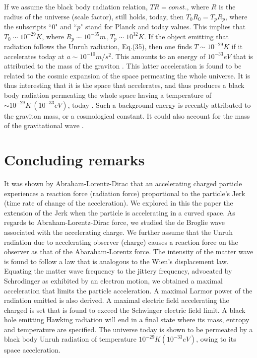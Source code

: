 \documentclass[a4]{epl2}
\begin{document}
If we assume the black body radiation relation, $TR=const.$, where $R$ is the radius of the universe (scale factor),  still holds, today, then $T_0R_0=T_pR_p$, where the subscripts ``0" and ``$p$" stand for Planck and today values. This implies that $T_0\sim 10^{-29}K$, where $R_p\sim 10^{-35}m\,, T_p\sim 10^{32}K$. If the object emitting that radiation follows the Unruh radiation, Eq.(35), then one finds $T\sim 10^{-29}K$ if it accelerates today at $a\sim 10^{-10}m/s^2$. This  amounts to an energy of $10^{-33}eV$ that is attributed to the mass of the graviton \textcolor[rgb]{0.00,0.07,1.00}{\cite{mass1,mass2}}. This latter acceleration is found to be related to the cosmic expansion of the space permeating the whole universe. It is thus interesting that it is the space that accelerates, and thus produces a black body radiation permeating the whole space having a temperature of $\sim 10^{-29}K  \,(10^{-33}eV)$, today \textcolor[rgb]{0.00,0.07,1.00}{\cite{quantum_arbab,caroll}}.  Such a background energy is recently attributed to the graviton mass, or a cosmological constant. It could also account for the mass of the gravitational wave \textcolor[rgb]{0.00,0.07,1.00}{\cite{graviton}}.


\section{\textcolor[rgb]{0.00,0.07,1.00}{Concluding remarks}}

It was shown by Abraham-Lorentz-Dirac that an accelerating charged particle experiences a reaction force (radiation force) proportional to the particle's Jerk (time rate of change of the acceleration). We explored in this the paper the extension of the Jerk when the particle is accelerating in a curved space. As regards to Abraham-Lorentz-Dirac force, we studied the de Broglie wave associated with the accelerating charge. We further assume that the Unruh radiation due to accelerating observer (charge) causes a reaction force on the observer as that of the Abaraham-Lorentz force. The intensity of the matter wave is found to follow a law that is  analogous to  the Wien's displacement law. Equating the matter wave frequency to the jittery frequency, advocated by Schrodinger as exhibited by an electron motion, we obtained a maximal acceleration that limits the particle acceleration. A maximal  Larmor power of the radiation emitted is also derived. A maximal electric field accelerating the charged is set that is found to exceed the Schwinger electric field limit. A black hole emitting Hawking radiation will end in a final state where its mass, entropy and temperature are specified. The universe today is shown to be permeated by a black body Unruh radiation of temperature $10^{-29}K (10^{-33}eV)$, owing to its space acceleration.
\end{document}
